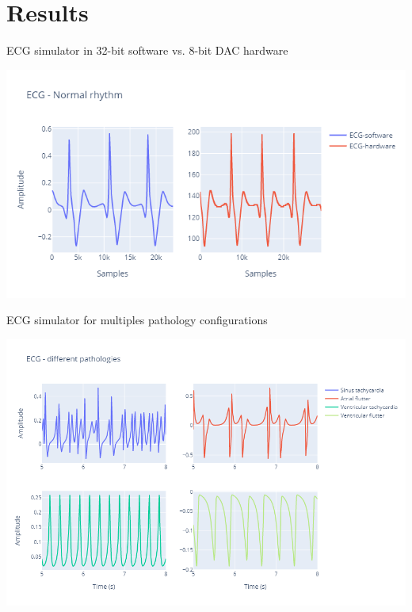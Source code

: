 \section{Results}


\begin{frame}{ECG simulator in 32-bit software vs. 8-bit DAC hardware}
\begin{minipage}[c][0.5\textheight][c]{\linewidth}
\begin{center}
    \includegraphics[height=0.8\textheight]{images/Simulator/simulator1.png}  
\end{center}
\end{minipage}
\end{frame}

\begin{frame}{ECG simulator for multiples pathology configurations}
\begin{minipage}[c][0.5\textheight][c]{\linewidth}
\begin{center}
    \includegraphics[height=0.8\textheight]{images/Simulator/simulator2.png}  
\end{center}
\end{minipage}
\end{frame}


